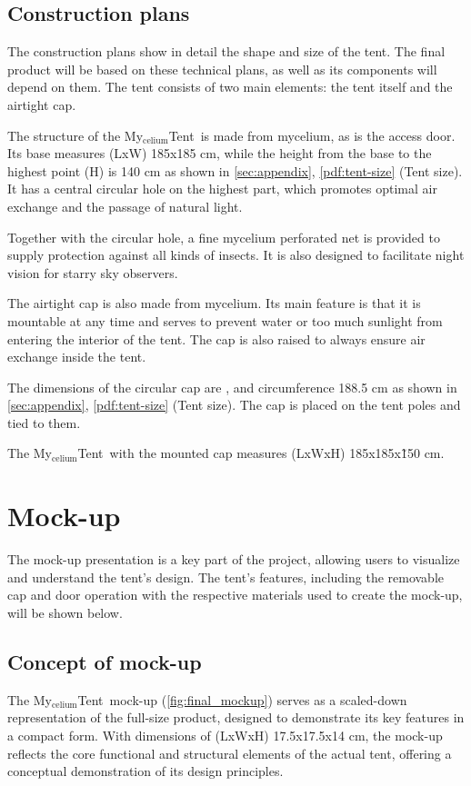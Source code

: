 \documentclass{article}
\newcommand{\myc}{My$_{\text{celium}}$Tent}
\begin{document}
\subsection{Construction plans}
The construction plans show in detail the shape and size of the tent. The final product
will be based on these technical plans, as well as its components will depend on them.
The tent consists of two main elements: the tent itself and the airtight cap.

The structure of the \myc\ is made from mycelium, as is the access door.
Its base measures (LxW) 185x185 cm, while the height from the base to the highest point (H)
is 140 cm as shown in \autoref{sec:appendix}, \autoref{pdf:tent-size} (Tent size).\\
It has a central circular hole on the highest part, which promotes optimal air exchange
and the passage of natural light.

Together with the circular hole, a fine mycelium perforated net is provided to supply
protection against all kinds of insects. It is also designed to facilitate night vision for starry
sky observers.

The airtight cap is also made from mycelium. Its main feature is that it is mountable at
any time and serves to prevent water or too much sunlight from entering the interior of
the tent. The cap is also raised to always ensure air exchange inside the tent.

The dimensions of the circular cap are \diameter 60cm, and circumference 188.5 cm
as shown in \autoref{sec:appendix}, \autoref{pdf:tent-size} (Tent size).
The cap is placed on the tent poles and tied to them.

The \myc\ with the mounted cap measures (LxWxH) 185x185x\~150 cm.

\section{Mock-up}
The mock-up presentation is a key part of the project, allowing users to visualize and
understand the tent's design. The tent's features, including the removable cap and door
operation with the respective materials used to create the mock-up, will be shown below.

\subsection{Concept of mock-up}
The \myc\ mock-up (\autoref{fig:final_mockup}) serves as a scaled-down representation of
the full-size product, designed to demonstrate its key features in a compact form. With
dimensions of (LxWxH) 17.5x17.5x14 cm, the mock-up reflects the core functional and
structural elements of the actual tent, offering a conceptual demonstration of its design
principles.
\end{document}
